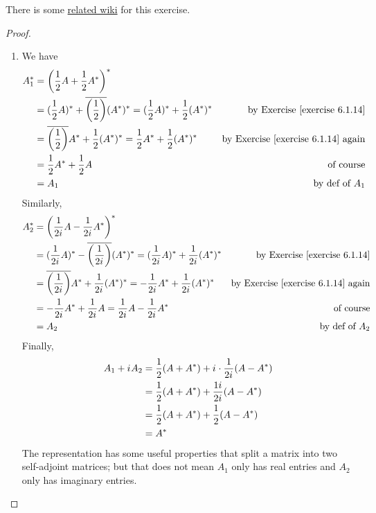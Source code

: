 \begin{note}
There is some \href{https://www.wikiwand.com/en/Hermitian_matrix#/Decomposition_into_Hermitian_and_skew-Hermitian_matrices}{related wiki} for this exercise.
\end{note}

\begin{proof} \ 

\begin{enumerate}
\item
We have
\begin{align*}
    A_1^* & = \left( \frac{1}{2} A + \frac{1}{2} A^* \right)^* \\
        & = (\frac{1}{2} A)^* + \conjugatet{\left(\frac{1}{2}\right)} (A^*)^* = (\frac{1}{2} A)^* + \frac{1}{2} (A^*)^* & \text{by \EXEC{6.1.14}} \\
        & = \conjugatet{\left(\frac{1}{2}\right)} A^* + \frac{1}{2} (A^*)^* = \frac{1}{2} A^* + \frac{1}{2} (A^*)^* & \text{by \EXEC{6.1.14} again} \\
        & = \frac{1}{2} A^* + \frac{1}{2} A & \text{of course} \\
        & = A_1 & \text{by def of \(A_1\)}
\end{align*}
Similarly,
\begin{align*}
    A_2^* & = \left( \frac{1}{2\iu} A - \frac{1}{2\iu} A^* \right)^* \\
        & = (\frac{1}{2\iu} A)^* - \conjugatet{\left(\frac{1}{2\iu}\right)} (A^*)^* = (\frac{1}{2\iu} A)^* + \frac{1}{2\iu} (A^*)^* & \text{by \EXEC{6.1.14}} \\
        & = \conjugatet{\left(\frac{1}{2\iu}\right)} A^* + \frac{1}{2\iu} (A^*)^* = -\frac{1}{2\iu} A^* + \frac{1}{2\iu} (A^*)^* & \text{by \EXEC{6.1.14} again} \\
        & = -\frac{1}{2\iu} A^* + \frac{1}{2\iu} A = \frac{1}{2\iu} A - \frac{1}{2\iu} A^* & \text{of course} \\
        & = A_2 & \text{by def of \(A_2\)}
\end{align*}
Finally,
\begin{align*}
    A_1 + {i\mkern1mu} A_2 & = \frac{1}{2} (A + A^*) + {i\mkern1mu} \cdot \frac{1}{2{i\mkern1mu}}(A - A^*) \\
        & = \frac{1}{2} (A + A^*) + \frac{1{i\mkern1mu}}{2{i\mkern1mu}}(A - A^*) \\
        & = \frac{1}{2} (A + A^*) + \frac{1}{2}(A - A^*) \\
        & = A^*
\end{align*}
The representation has some useful properties that split a matrix into two self-adjoint matrices; but that does not mean \(A_1\) only has real entries and \(A_2\) only has imaginary entries.


\end{enumerate}
\end{proof}
